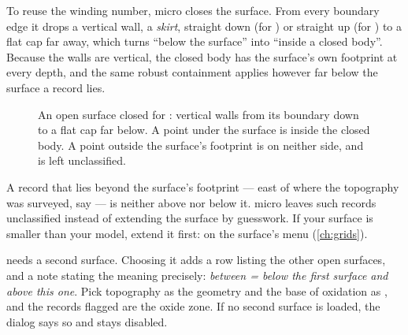 To reuse the winding number, micro closes the surface. From every boundary edge it drops a vertical wall, a \emph{skirt}, straight down (for ) or straight up (for ) to a flat cap far away, which turns “below the surface” into “inside a closed body”. Because the walls are vertical, the closed body has the surface's own footprint at every depth, and the same robust containment applies however far below the surface a record lies.

\begin{figure}[htbp]\centering
{}
\caption{An open surface closed for : vertical walls from its boundary down to a flat cap far below. A point under the surface is inside the closed body. A point outside the surface's footprint is on neither side, and is left unclassified.}\label{fig:geometry-skirt}
\end{figure}

A record that lies beyond the surface's footprint — east of where the topography was surveyed, say — is neither above nor below it. micro leaves such records unclassified instead of extending the surface by guesswork. If your surface is smaller than your model, extend it first:  on the surface's menu (\cref{ch:grids}).

 needs a second surface. Choosing it adds a  row listing the other open surfaces, and a note stating the meaning precisely: \emph{between = below the first surface and above this one}. Pick topography as the geometry and the base of oxidation as , and the records flagged are the oxide zone. If no second surface is loaded, the dialog says so and  stays disabled.

